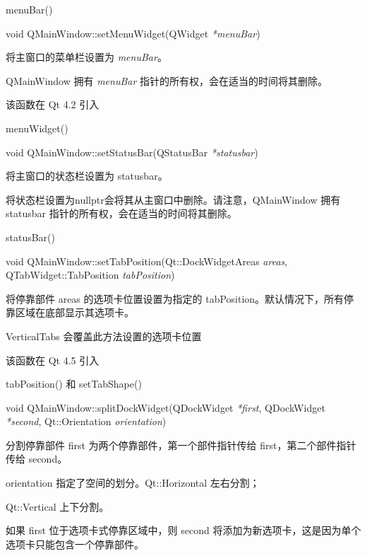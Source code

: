 \begin{seeAlso}
menuBar()
\end{seeAlso}

\splitLine

void QMainWindow::setMenuWidget(QWidget \emph{*menuBar})

将主窗口的菜单栏设置为 \emph{menuBar}。

QMainWindow 拥有 \emph{menuBar} 指针的所有权，会在适当的时间将其删除。

该函数在 Qt 4.2 引入

\begin{seeAlso}
menuWidget()
\end{seeAlso}

\splitLine

void QMainWindow::setStatusBar(QStatusBar \emph{*statusbar})

将主窗口的状态栏设置为 statusbar。

将状态栏设置为nullptr会将其从主窗口中删除。请注意，QMainWindow 拥有 statusbar 指针的所有权，会在适当的时间将其删除。

\begin{seeAlso}
statusBar()
\end{seeAlso}

\splitLine

void QMainWindow::setTabPosition(Qt::DockWidgetAreas \emph{areas}, QTabWidget::TabPosition \emph{tabPosition})

将停靠部件 areas 的选项卡位置设置为指定的 tabPosition。默认情况下，所有停靠区域在底部显示其选项卡。

\begin{notice}
VerticalTabs 会覆盖此方法设置的选项卡位置
\end{notice}

该函数在 Qt 4.5 引入

\begin{seeAlso}
tabPosition() 和 setTabShape()
\end{seeAlso}

\splitLine

void QMainWindow::splitDockWidget(QDockWidget \emph{*first}, QDockWidget \emph{*second}, Qt::Orientation \emph{orientation})

分割停靠部件 first 为两个停靠部件，第一个部件指针传给 first，第二个部件指针传给 second。

orientation 指定了空间的划分。Qt::Horizontal 左右分割；

Qt::Vertical 上下分割。

\begin{notice}
如果 first 位于选项卡式停靠区域中，则 second 将添加为新选项卡，这是因为单个选项卡只能包含一个停靠部件。
    \end{notice}

